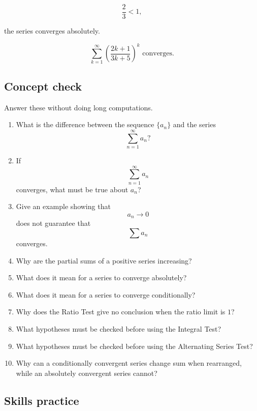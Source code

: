 \[
\frac23<1,
\]

the series converges absolutely.

\[
\boxed{
\sum_{k=1}^{\infty}
\left(\frac{2k+1}{3k+5}\right)^k
\text{ converges.}
}
\]

\subsection{Concept check}
\label{subsec:series-concept-check}

Answer these without doing long computations.

\begin{enumerate}
\item What is the difference between the sequence \(\{a_n\}\) and the series
\[
\sum_{n=1}^{\infty}a_n?
\]

\item If
\[
\sum_{n=1}^{\infty}a_n
\]
converges, what must be true about \(a_n\)?

\item Give an example showing that
\[
a_n\to0
\]
does not guarantee that
\[
\sum a_n
\]
converges.

\item Why are the partial sums of a positive series increasing?

\item What does it mean for a series to converge absolutely?

\item What does it mean for a series to converge conditionally?

\item Why does the Ratio Test give no conclusion when the ratio limit is \(1\)?

\item What hypotheses must be checked before using the Integral Test?

\item What hypotheses must be checked before using the Alternating Series Test?

\item Why can a conditionally convergent series change sum when rearranged, while an
absolutely convergent series cannot?
\end{enumerate}

\subsection{Skills practice}
\label{subsec:series-skills-practice}

